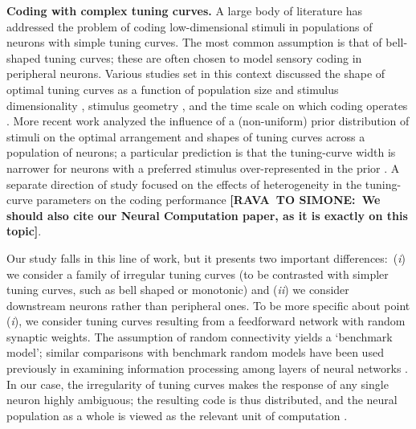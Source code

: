 \documentclass[a4paper]{article}%
\begin{document}
\textbf{Coding with complex tuning curves.} A large body of literature has
addressed the problem of coding low-dimensional stimuli in populations of
neurons with simple tuning curves. The most common assumption is that of
bell-shaped tuning curves; these are often chosen to model sensory coding in
peripheral neurons. Various studies set in this context discussed the shape of
optimal tuning curves as a function of population size and stimulus
dimensionality \cite{Zhang1999NeuronalBroaden}, stimulus geometry
\cite{Montemurro2006OptimalVariables}, and the time scale on which coding
operates \cite{Bethge2002OptimalFails,Yaeli2010Error-basedNeurons}. More
recent work analyzed the influence of a (non-uniform) prior distribution of
stimuli on the optimal arrangement and shapes of tuning curves across a
population of neurons; a particular prediction is that the tuning-curve width
is narrower for neurons with a preferred stimulus over-represented in the
prior
\cite{Wei2012EfficientInference,Ganguli2014EfficientPopulations,Yerxa2020EfficientStimuli}%
. A separate direction of study focused on the effects of heterogeneity in the
tuning-curve parameters on the coding performance
\cite{Wilke2002RepresentationalPopulations,Shamir2006ImplicationsCoding,Fiscella2015VisualNeurons}
\textbf{[RAVA\ TO SIMONE:\ We should also cite our Neural Computation paper,
as it is exactly on this topic]}.

Our study falls in this line of work, but it presents two important
differences:\ (\textit{i}) we consider a family of irregular tuning curves (to
be contrasted with simpler tuning curves, such as bell shaped or monotonic)
and (\textit{ii}) we consider downstream neurons rather than peripheral ones.
To be more specific about point (\textit{i}), we consider tuning curves
resulting from a feedforward network with random synaptic weights. The
assumption of random connectivity yields a `benchmark model'; similar
comparisons with benchmark random models have been used previously in
examining information processing among layers of neural networks
\cite{Barak2013TheTrade-off,Babadi2014SparsenessRepresentations,Litwin-Kumar2017OptimalConnectivity}%
. In our case, the irregularity of tuning curves makes the response of any
single neuron highly ambiguous; the resulting code is thus distributed, and
the neural population as a whole is viewed as the relevant unit of computation
\cite{Saxena2019TowardsDoctrine}.
\end{document}
